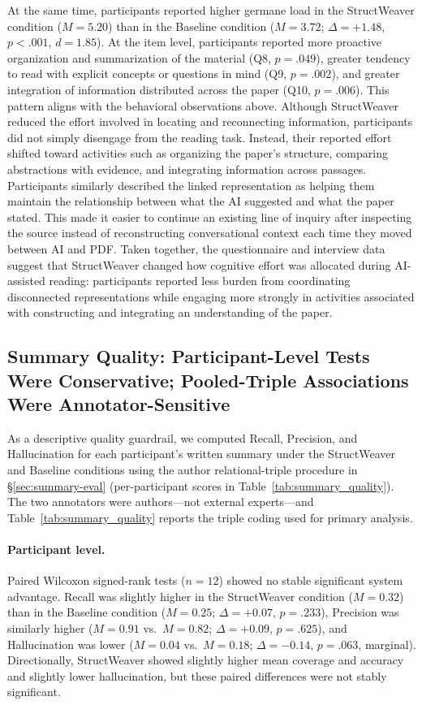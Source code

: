 \documentclass[manuscript,review,anonymous]{acmart}
\begin{document}
At the same time, participants reported higher germane load in the StructWeaver condition ($M=5.20$) than in the Baseline condition ($M=3.72$; $\Delta=+1.48$, $p<.001$, $d=1.85$). At the item level, participants reported more proactive organization and summarization of the material (Q8, $p=.049$), greater tendency to read with explicit concepts or questions in mind (Q9, $p=.002$), and greater integration of information distributed across the paper (Q10, $p=.006$). This pattern aligns with the behavioral observations above. Although StructWeaver reduced the effort involved in locating and reconnecting information, participants did not simply disengage from the reading task. Instead, their reported effort shifted toward activities such as organizing the paper's structure, comparing abstractions with evidence, and integrating information across passages. Participants similarly described the linked representation as helping them maintain the relationship between what the AI suggested and what the paper stated. This made it easier to continue an existing line of inquiry after inspecting the source instead of reconstructing conversational context each time they moved between AI and PDF. Taken together, the questionnaire and interview data suggest that StructWeaver changed how cognitive effort was allocated during AI-assisted reading: participants reported less burden from coordinating disconnected representations while engaging more strongly in activities associated with constructing and integrating an understanding of the paper.



\subsection{Summary Quality: Participant-Level Tests Were Conservative; Pooled-Triple Associations Were Annotator-Sensitive}
\label{sec:summary-quality-results}

As a descriptive quality guardrail, we computed Recall, Precision, and Hallucination for each participant's written summary under the StructWeaver and Baseline conditions using the author relational-triple procedure in \S\ref{sec:summary-eval} (per-participant scores in Table~\ref{tab:summary_quality}). The two annotators were authors---not external experts---and Table~\ref{tab:summary_quality} reports the triple coding used for primary analysis.

\paragraph{Participant level.}
Paired Wilcoxon signed-rank tests ($n=12$) showed no stable significant system advantage. Recall was slightly higher in the StructWeaver condition ($M=0.32$) than in the Baseline condition ($M=0.25$; $\Delta=+0.07$, $p=.233$), Precision was similarly higher ($M=0.91$ vs.\ $M=0.82$; $\Delta=+0.09$, $p=.625$), and Hallucination was lower ($M=0.04$ vs.\ $M=0.18$; $\Delta=-0.14$, $p=.063$, marginal). Directionally, StructWeaver showed slightly higher mean coverage and accuracy and slightly lower hallucination, but these paired differences were not stably significant.
\end{document}

